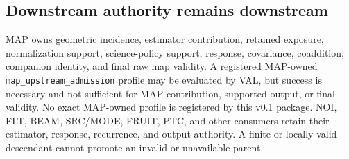 \subsection{Downstream authority remains downstream}

MAP owns geometric incidence, estimator contribution, retained exposure,
normalization support, science-policy support, response, covariance,
coaddition, companion identity, and final raw map validity. A registered
MAP-owned \texttt{map\_upstream\_admission} profile may be evaluated by VAL,
but success is necessary and not sufficient for MAP contribution, supported
output, or final validity. No exact MAP-owned profile is registered by this
v0.1 package. NOI, FLT, BEAM, SRC/MODE, FRUIT, PTC, and other consumers retain
their estimator, response, recurrence, and output authority. A finite or
locally valid descendant cannot promote an invalid or unavailable parent.
